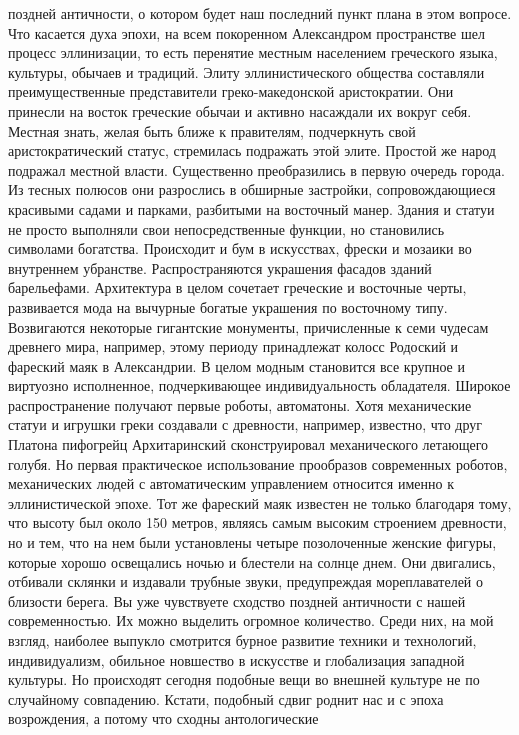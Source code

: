 поздней античности, о котором будет наш последний пункт плана в этом вопросе.
Что касается духа эпохи, на всем покоренном Александром пространстве шел процесс
эллинизации, то есть перенятие местным населением греческого языка, культуры,
обычаев и традиций. Элиту эллинистического общества составляли преимущественные
представители греко-македонской аристократии. Они принесли на восток греческие
обычаи и активно насаждали их вокруг себя. Местная знать, желая быть ближе к
правителям, подчеркнуть свой аристократический статус, стремилась подражать этой
элите. Простой же народ подражал местной власти. Существенно преобразились в
первую очередь города. Из тесных полюсов они разрослись в обширные застройки,
сопровождающиеся красивыми садами и парками, разбитыми на восточный манер.
Здания и статуи не просто выполняли свои непосредственные функции, но
становились символами богатства. Происходит и бум в искусствах, фрески и мозаики
во внутреннем убранстве. Распространяются украшения фасадов зданий барельефами.
Архитектура в целом сочетает греческие и восточные черты, развивается мода на
вычурные богатые украшения по восточному типу. Возвигаются некоторые гигантские
монументы, причисленные к семи чудесам древнего мира, например, этому периоду
принадлежат колосс Родоский и фареский маяк в Александрии. В целом модным
становится все крупное и виртуозно исполненное, подчеркивающее индивидуальность
обладателя. Широкое распространение получают первые роботы, автоматоны. Хотя
механические статуи и игрушки греки создавали с древности, например, известно,
что друг Платона пифогрейц Архитаринский сконструировал механического летающего
голубя. Но первая практическое использование прообразов современных роботов,
механических людей с автоматическим управлением относится именно к
эллинистической эпохе. Тот же фареский маяк известен не только благодаря тому,
что высоту был около 150 метров, являясь самым высоким строением древности, но и
тем, что на нем были установлены четыре позолоченные женские фигуры, которые
хорошо освещались ночью и блестели на солнце днем. Они двигались, отбивали
склянки и издавали трубные звуки, предупреждая мореплавателей о близости берега.
Вы уже чувствуете сходство поздней античности с нашей современностью. Их можно
выделить огромное количество. Среди них, на мой взгляд, наиболее выпукло
смотрится бурное развитие техники и технологий, индивидуализм, обильное
новшество в искусстве и глобализация западной культуры. Но происходят сегодня
подобные вещи во внешней культуре не по случайному совпадению. Кстати, подобный
сдвиг роднит нас и с эпоха возрождения, а потому что сходны антологические
